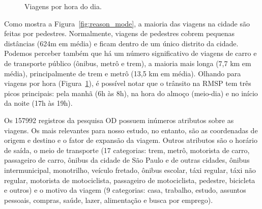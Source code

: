 \begin{figure}
\caption{Viagens por hora do dia.}
\label{fig:trips_by_hour}
\end{figure}

Como mostra a Figura~\ref{fig:reason_mode}, a maioria das viagens na cidade são feitas por
pedestres. Normalmente, viagens de pedestres cobrem pequenas distâncias (624m em média)
e ficam dentro de um único distrito da cidade. Podemos perceber também que há
um número significativo de viagens de carro e de transporte público
(ônibus, metrô e trem), a maioria mais longa (7,7 km em média), principalmente
de trem e metrô (13,5 km em média). Olhando para viagens por hora (Figura~\ref{fig:trips_by_hour}),
é possível notar que o trânsito na RMSP tem três picos principais: pela manhã (6h às 8h),
na hora do almoço (meio-dia) e no início da noite (17h às 19h).

Os \num{157992} registros da pesquisa OD possuem inúmeros atributos sobre as
viagens. Os mais relevantes para nosso estudo, no entanto, são as coordenadas de
origem e destino e o fator de expansão da viagem. Outros atributos são o horário
de saída, o meio de transporte (17 categorias: trem, metrô, motorista
de carro, passageiro de carro, ônibus da cidade de São Paulo e de outras
cidades, ônibus intermunicipal, monotrilho, veículo fretado, ônibus escolar,
táxi regular, táxi não regular, motorista de motociclista, passageiro de
motociclista, pedestre, bicicleta e outros) e o motivo da viagem (9 categorias:
casa, trabalho, estudo, assuntos pessoais, compras, saúde, lazer, alimentação e
busca por emprego).

